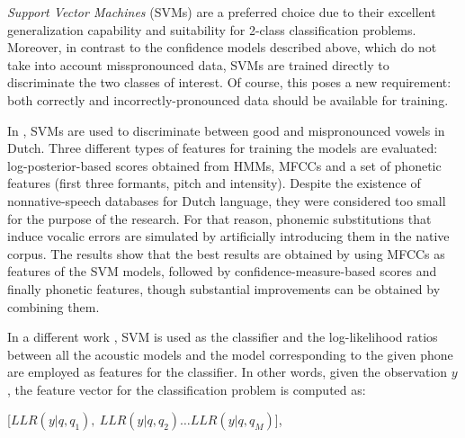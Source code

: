 \textit{Support Vector Machines} (SVMs) are a preferred choice 
due to their excellent generalization capability and suitability for 2-class classification
problems. Moreover, in contrast to the confidence models described above, which do not take into
account misspronounced data, SVMs are trained directly to discriminate the two classes of interest.
Of course, this poses a new requirement: both correctly and incorrectly-pronounced data should be
available for training.

In \cite{detection_mispronunciation_dutch_vowel}, SVMs are used to discriminate
between good and mispronounced vowels in Dutch.
Three different types of features for training the models are evaluated: log-posterior-based 
scores obtained from HMMs, MFCCs and a set of 
phonetic features (first three formants, pitch and intensity). Despite the existence of nonnative-speech  
databases for Dutch language, they were considered too small for the purpose of the research. 
For that reason, phonemic 
substitutions that induce vocalic errors are simulated by artificially introducing them in the native corpus.
The results show that the best 
results are obtained by using MFCCs as features of the SVM models, followed by confidence-measure-based 
scores and finally phonetic
features, though substantial improvements can be obtained by combining them.

In a different work \cite{svm_space_models}, SVM is used as the classifier and the
log-likelihood ratios between all the acoustic models and the model corresponding to the given
phone are employed as features for the classifier. In other words, given the observation
$y$, the feature vector for the classification problem is computed as:

[$LLR(y|q,q_{1}), \ LLR(y|q,q_{2}) \dotsc LLR(y|q, q_{M})$],

